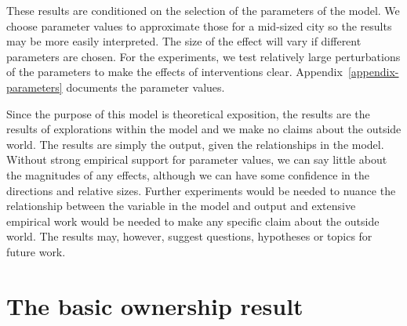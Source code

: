 These results are conditioned on the selection of the parameters of the model. We choose parameter values to approximate those for a mid-sized city so the results may be more easily interpreted.  The size of the effect will vary if different parameters are chosen. %
For the experiments, we test relatively large perturbations of the parameters to make the effects of interventions clear. Appendix~\ref{appendix-parameters} documents the parameter values.


Since the purpose of this model is \gls{theoretical exposition}, the results are the results of explorations within the model and we make no claims about the outside world. %
The results are simply the output, given the relationships in the model. 
Without strong empirical support for parameter values, we can say little about the magnitudes of any effects, although we can have some confidence in the directions and relative sizes.  Further experiments would be needed to nuance the relationship between the variable in the model and output and extensive empirical work would be needed to make any specific claim about the outside world. 
The results may, however, suggest questions, hypotheses or topics for future work. %






\section{The basic ownership result}


